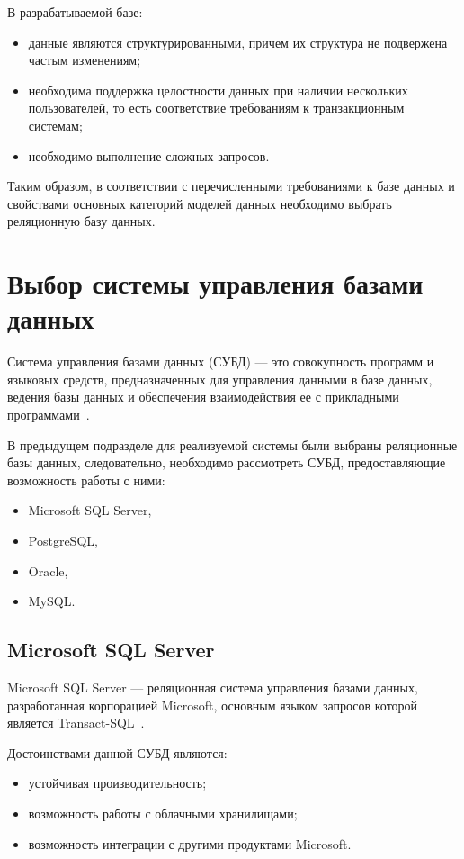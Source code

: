 В разрабатываемой базе:

\begin{itemize}
    \item данные являются структурированными, причем их структура не подвержена
        частым изменениям;
    \item необходима поддержка целостности данных при наличии нескольких
        пользователей, то есть соответствие требованиям к транзакционным
        системам;
    \item необходимо выполнение сложных запросов.
\end{itemize}

Таким образом, в соответствии с перечисленными требованиями к базе данных и
свойствами основных категорий моделей данных необходимо выбрать реляционную
базу данных.

\section{Выбор системы управления базами данных}

Система управления базами данных (СУБД) --- это совокупность программ и языковых
средств, предназначенных для управления данными в базе данных, ведения базы
данных и обеспечения взаимодействия ее с прикладными программами~\cite{gost01}.

В предыдущем подразделе для реализуемой системы были выбраны реляционные
базы данных, следовательно, необходимо рассмотреть СУБД, предоставляющие
возможность работы с ними:
\begin{itemize}
    \item Microsoft SQL Server,
    \item PostgreSQL,
    \item Oracle,
    \item MySQL.
\end{itemize}

\subsection{Microsoft SQL Server}

Microsoft SQL Server --- реляционная система управления базами данных,
разработанная корпорацией Microsoft, основным языком запросов
которой является Transact-SQL~\cite{art06}.

Достоинствами данной СУБД являются:
\begin{itemize}
    \item устойчивая производительность;
    \item возможность работы с облачными хранилищами;
    \item возможность интеграции с другими продуктами Microsoft.
\end{itemize}

